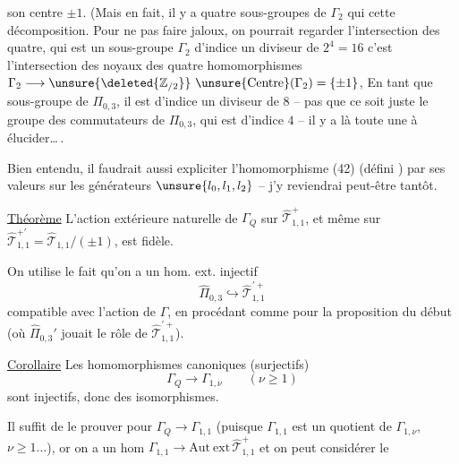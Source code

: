 son centre $\pm1$. (Mais en fait, il y a  quatre sous-groupes de $\Gamma_2$ qui  cette décomposition. Pour ne pas faire  jaloux, on pourrait regarder l'intersection des quatre, qui est un sous-groupe $\Gamma_2$ d'indice un diviseur de $2^4=16$ c'est l'intersection des noyaux des quatre homomorphismes $\Gamma_2\longrightarrow\unsure{\deleted{\mathbb Z_{/2}}}\ \unsure{\mathrm{Centre}}(\Gamma_2)=\{\pm1\}$,
En tant que sous-groupe de $\Pi_{0,3}$, il est d'indice un diviseur de $8$ --  pas que ce soit juste le groupe des commutateurs de $\Pi_{0,3}$, qui est d'indice $4$ -- il y a là toute une  à élucider\ldots\,.

Bien entendu, il faudrait aussi expliciter l'homomorphisme (42) (défini   ) par ses valeurs sur les générateurs $\unsure{l_0,l_1,l_2}$ -- j'y reviendrai peut-être tantôt.


\uline{Théorème} L'action extérieure naturelle de $\Gamma_Q$ sur $\widehat{\mathcal T}_{1,1}^{+}$, et même sur $\widehat{\mathcal T}_{1,1}^{+\prime}=\widehat{\mathcal T}_{1,1}/(\pm1)$, est fidèle.

On utilise le fait qu'on a un hom. ext. injectif
\[
\widehat{\Pi}_{0,3}\hookrightarrow\widehat{\mathcal T}_{1,1}^{\prime+}
\]
compatible avec l'action de $\Gamma$, en procédant comme pour la proposition du début (où $\widehat{\Pi}_{0,3}'$ jouait le rôle de $\widehat{\mathcal T}_{1,1}^{\prime+}$).

\uline{Corollaire} Les homomorphismes canoniques (surjectifs)
\[
\tag{43}
\Gamma_Q\longrightarrow\Gamma_{1,\nu}\qquad(\nu\geq1)
\]
sont injectifs, donc des isomorphismes.

Il suffit de le prouver pour $\Gamma_Q\longrightarrow\Gamma_{1,1}$ (puisque $\Gamma_{1,1}$ est un quotient de $\Gamma_{1,\nu}$, $\nu\geq1\ldots$), or on a un hom  $\Gamma_{1,1}\longrightarrow\mathrm{Aut\ ext}\,\widehat{\mathcal T}_{1,1}^{+}$ et on peut considérer le 
